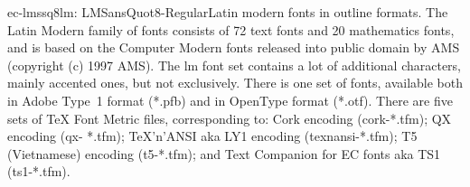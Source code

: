 \documentclass{ddltxtyp}
\begin{document}
\begin{package}{ec-lmssq8}{lm: LMSansQuot8-Regular}{Latin modern fonts in outline formats.}
The Latin Modern family of fonts consists of 72 text fonts and
20 mathematics fonts, and is based on the Computer Modern fonts
released into public domain by AMS (copyright (c) 1997 AMS).
The lm font set contains a lot of additional characters, mainly
accented ones, but not exclusively. There is one set of fonts,
available both in Adobe Type~1 format (*.pfb) and in OpenType
format (*.otf). There are five sets of {\TeX} Font Metric files,
corresponding to: Cork encoding (cork-*.tfm); QX encoding (qx-
*.tfm); {\TeX}'n'ANSI aka LY1 encoding (texnansi-*.tfm); T5
(Vietnamese) encoding (t5-*.tfm); and Text Companion for EC
fonts aka TS1 (ts1-*.tfm).
\end{package}
\end{document}
